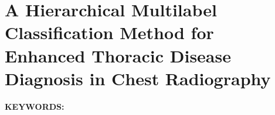 \renewcommand{\figurepath}[1]{Chapters/taxonomy/figures/#1}

\chapter{A Hierarchical Multilabel Classification Method for Enhanced Thoracic Disease Diagnosis in Chest Radiography}\label{ch:taxonomy}

%

\textbf{KEYWORDS:\;} %

\newpage


